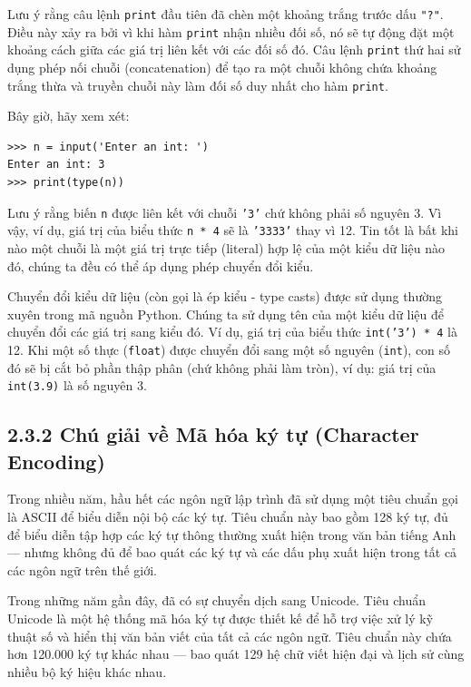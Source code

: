 Lưu ý rằng câu lệnh \texttt{print} đầu tiên đã chèn một khoảng trắng trước dấu \texttt{"?"}. Điều này xảy ra bởi vì khi hàm \texttt{print} nhận nhiều đối số, nó sẽ tự động đặt một khoảng cách giữa các giá trị liên kết với các đối số đó. Câu lệnh \texttt{print} thứ hai sử dụng phép nối chuỗi (concatenation) để tạo ra một chuỗi không chứa khoảng trắng thừa và truyền chuỗi này làm đối số duy nhất cho hàm \texttt{print}.

Bây giờ, hãy xem xét:

\begin{verbatim}
>>> n = input('Enter an int: ') 
Enter an int: 3 
>>> print(type(n))
\end{verbatim}

Lưu ý rằng biến \texttt{n} được liên kết với chuỗi \texttt{'3'} chứ không phải số nguyên 3. Vì vậy, ví dụ, giá trị của biểu thức \texttt{n * 4} sẽ là \texttt{'3333'} thay vì 12. Tin tốt là bất khi nào một chuỗi là một giá trị trực tiếp (literal) hợp lệ của một kiểu dữ liệu nào đó, chúng ta đều có thể áp dụng phép chuyển đổi kiểu.

Chuyển đổi kiểu dữ liệu (còn gọi là ép kiểu - type casts) được sử dụng thường xuyên trong mã nguồn Python. Chúng ta sử dụng tên của một kiểu dữ liệu để chuyển đổi các giá trị sang kiểu đó. Ví dụ, giá trị của biểu thức \texttt{int('3') * 4} là 12. Khi một số thực (\texttt{float}) được chuyển đổi sang một số nguyên (\texttt{int}), con số đó sẽ bị cắt bỏ phần thập phân (chứ không phải làm tròn), ví dụ: giá trị của \texttt{int(3.9)} là số nguyên 3.

\subsection*{2.3.2 Chú giải về Mã hóa ký tự (Character Encoding)}

\noindent \indent Trong nhiều năm, hầu hết các ngôn ngữ lập trình đã sử dụng một tiêu chuẩn gọi là ASCII để biểu diễn nội bộ các ký tự. Tiêu chuẩn này bao gồm 128 ký tự, đủ để biểu diễn tập hợp các ký tự thông thường xuất hiện trong văn bản tiếng Anh — nhưng không đủ để bao quát các ký tự và các dấu phụ xuất hiện trong tất cả các ngôn ngữ trên thế giới.

Trong những năm gần đây, đã có sự chuyển dịch sang Unicode. Tiêu chuẩn Unicode là một hệ thống mã hóa ký tự được thiết kế để hỗ trợ việc xử lý kỹ thuật số và hiển thị văn bản viết của tất cả các ngôn ngữ. Tiêu chuẩn này chứa hơn 120.000 ký tự khác nhau — bao quát 129 hệ chữ viết hiện đại và lịch sử cùng nhiều bộ ký hiệu khác nhau.

